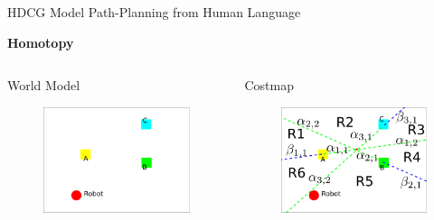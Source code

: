 \begin{frame}{HDCG}{ Model Path-Planning from Human Language }
	
	{\bf Homotopy}
	
	\begin{columns}	
	\begin{block}{World Model}
	\begin{figure}
		\centering
		\includegraphics[width=.9\linewidth]{figure/homotopy/example_a}
	\end{figure}
	\end{block}
	\begin{block}{Costmap}
	\begin{figure}
		\centering
		\includegraphics[width=.9\linewidth]{figure/homotopy/example_a_decomp}
	\end{figure}
	\end{block}

\end{columns}
\end{frame}
